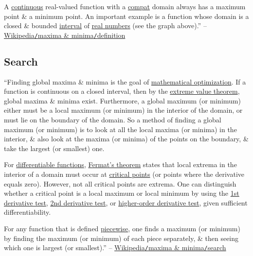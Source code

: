 \documentclass[oneside]{book}
\numberwithin{equation}{section}
\begin{document}
A \href{https://en.wikipedia.org/wiki/Continuous_function}{continuous} real-valued function with a \href{https://en.wikipedia.org/wiki/Compact_space}{compat} domain always has a maximum point \& a minimum point. An important example is a function whose domain is a closed \& bounded \href{https://en.wikipedia.org/wiki/Interval_(mathematics)}{interval} of \href{https://en.wikipedia.org/wiki/Real_number}{real numbers} (see the graph above).'' -- \href{https://en.wikipedia.org/wiki/Maxima_and_minima#Definition}{Wikipedia\texttt{/}maxima \& minima\texttt{/}definition}

\subsection{Search}
``Finding global maxima \& minima is the goal of \href{https://en.wikipedia.org/wiki/Mathematical_optimization}{mathematical optimization}. If a function is continuous on a closed interval, then by the \href{https://en.wikipedia.org/wiki/Extreme_value_theorem}{extreme value theorem}, global maxima \& minima exist. Furthermore, a global maximum (or minimum) either must be a local maximum (or minimum) in the interior of the domain, or must lie on the boundary of the domain. So a method of finding a global maximum (or minimum) is to look at all the local maxima (or minima) in the interior, \& also look at the maxima (or minima) of the points on the boundary, \& take the largest (or smallest) one.

For \href{https://en.wikipedia.org/wiki/Differentiable_functions}{differentiable functions}, \href{https://en.wikipedia.org/wiki/Fermat%27s_theorem_(stationary_points)}{Fermat's theorem} states that local extrema in the interior of a domain must occur at \href{https://en.wikipedia.org/wiki/Critical_point_(mathematics)}{critical points} (or points where the derivative equals zero). However, not all critical points are extrema. One can distinguish whether a critical point is a local maximum or local minimum by using the \href{https://en.wikipedia.org/wiki/First_derivative_test}{1st derivative test}, \href{https://en.wikipedia.org/wiki/Derivative_test#Second_derivative_test_(single_variable)}{2nd derivative test}, or \href{https://en.wikipedia.org/wiki/Higher-order_derivative_test}{higher-order derivative test}, given sufficient differentiability.

For any function that is defined \href{https://en.wikipedia.org/wiki/Piecewise}{piecewise}, one finds a maximum (or minimum) by finding the maximum (or minimum) of each piece separately, \& then seeing which one is largest (or smallest).'' -- \href{https://en.wikipedia.org/wiki/Maxima_and_minima#Search}{Wikipedia\texttt{/}maxima \& minima\texttt{/}search}
\end{document}

